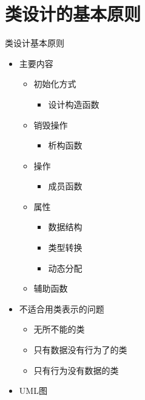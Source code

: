\section[类设计原则]{类设计的基本原则}
\begin{frame}{类设计}{基本原则}%
  \stretchon
  \begin{itemize}
  \item 主要内容
    \begin{itemize}
    \item 初始化方式
      \begin{itemize}
      \item 设计构造函数
      \end{itemize}
    \item 销毁操作
      \begin{itemize}
      \item 析构函数
      \end{itemize}
    \item 操作
      \begin{itemize}
      \item 成员函数
      \end{itemize}
    \item 属性
      \begin{itemize}
      \item 数据结构
      \item 类型转换
      \item 动态分配
      \end{itemize}
    \item 辅助函数
    \end{itemize}
  \item 不适合用类表示的问题
    \begin{itemize}
    \item 无所不能的类
    \item 只有数据没有行为了的类
    \item 只有行为没有数据的类
    \end{itemize}
  \item UML图
  \end{itemize}
  \stretchoff
\end{frame}



